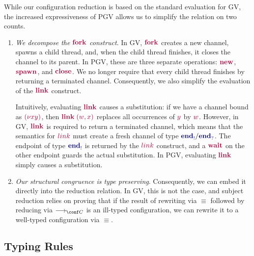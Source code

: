While our configuration reduction is based on the standard evaluation for GV, the increased expressiveness of PGV allows us to simplify the relation on two counts.
\begin{enumerate}[label=(\roman*)]
  \item
        \emph{We decompose the $\tm{\fork}$ construct}.
        In GV, $\tm{\fork}$ creates a new channel, spawns a child thread, and, when the child thread finishes, it closes the channel to its parent. In PGV, these are three separate operations: $\tm{\new}$, $\tm{\spawn}$, and $\tm{\close}$. We no longer require that every child thread finishes by returning a terminated channel. Consequently, we also simplify the evaluation of the $\tm{\link}$ construct.

        Intuitively, evaluating $\tm{\link}$ causes a substitution: if we have a channel bound as $\tm{\res{x}{y}{}}$, then $\tm{\link\;\pair{w}{x}}$ replaces all occurrences of $\tm{y}$ by $\tm{w}$. However, in GV, $\tm{\link}$ is required to return a terminated channel, which means that the semantics for $\tm{link}$ must {create} a fresh channel of type $\ty{\tyends}/\ty{\tyendr}$. The endpoint of type $\ty{\tyends}$ is returned by the $\tm{link}$ construct, and a $\tm{\wait}$ on the other endpoint guards the {actual} substitution. In PGV, evaluating $\tm{\link}$ simply causes a substitution.
  \item
        \emph{Our structural congruence is type preserving}. Consequently, we can embed it directly into the reduction relation. In GV, this is not the case, and subject reduction relies on proving that if the result of rewriting via $\equiv$ followed by reducing via $\cred$ is an ill-typed configuration, we can rewrite it to a well-typed configuration via $\equiv$.
\end{enumerate}


\subsection{Typing Rules}


